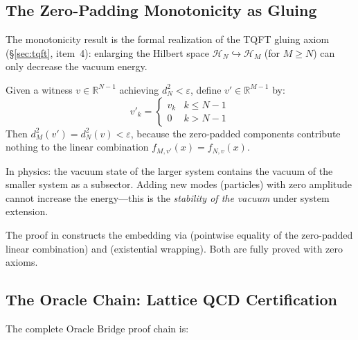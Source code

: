 \subsection{The Zero-Padding Monotonicity as Gluing}

The monotonicity result  is the
formal realization of the TQFT gluing axiom (§\ref{sec:tqft},
item~4): enlarging the Hilbert space $\mathcal{H}_N \hookrightarrow
\mathcal{H}_M$ (for $M \geq N$) can only decrease the vacuum energy.

\begin{correspondence}
\label{corr:zero-padding}
Given a witness $v \in \mathbb{R}^{N-1}$ achieving $d_N^2 < \varepsilon$,
define $v' \in \mathbb{R}^{M-1}$ by:
\[
  v'_k = \begin{cases} v_k & k \leq N-1 \\ 0 & k > N-1 \end{cases}
\]
Then $d_M^2(v') = d_N^2(v) < \varepsilon$, because the zero-padded
components contribute nothing to the linear combination
$f_{M,v'}(x) = f_{N,v}(x)$.

In physics: the vacuum state of the larger system contains the vacuum
of the smaller system as a subsector. Adding new modes (particles)
with zero amplitude cannot increase the energy---this is the
\emph{stability of the vacuum} under system extension.

The proof in  constructs the embedding via
 (pointwise equality of the zero-padded
linear combination) and  (existential wrapping).
Both are fully proved with zero axioms.
\end{correspondence}

\subsection{The Oracle Chain: Lattice QCD Certification}

The complete Oracle Bridge proof chain is:

